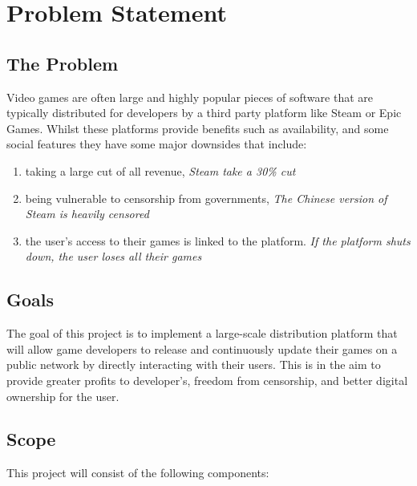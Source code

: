 
\chapter{Problem Statement}

\section{The Problem}
\label{sec:problem}

Video games are often large and highly popular pieces of software that are typically distributed for developers by a third party platform like Steam or Epic Games. Whilst these platforms provide benefits such as availability, and some social features they have some major downsides that include:
\vspace{1mm}
\begin{enumerate}[label=(\alph*)]
  \item taking a large cut of all revenue, \newline\textit{Steam take a 30\% cut~\cite{marks_report_2019,brown_valve_2021}}
  \item being vulnerable to censorship from governments, \newline\textit{The Chinese version of Steam is heavily censored~\cite{steamdb_steam_2021}}
  \item the user's access to their games is linked to the platform. \newline\textit{If the platform shuts down, the user loses all their games}
\end{enumerate}
\vspace{1mm}

\section{Goals}

The goal of this project is to implement a large-scale distribution platform that will allow game developers to release and continuously update their games on a public network by directly interacting with their users. This is in the aim to provide greater profits to developer's, freedom from censorship, and better digital ownership for the user.

\section{Scope}

This project will consist of the following components:

